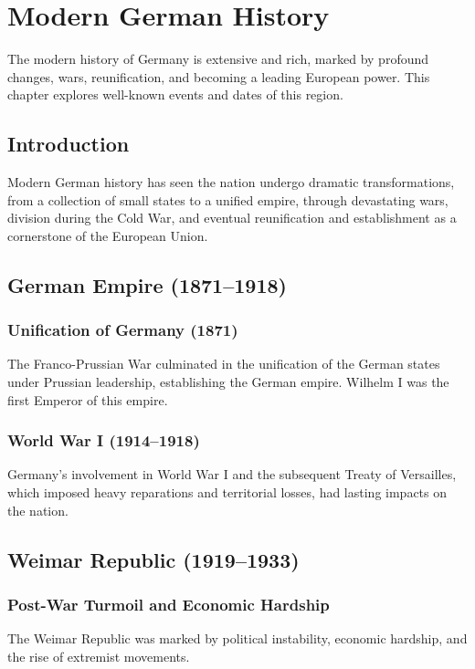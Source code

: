 \documentclass[a4paper,12pt]{book}
\begin{document}
\chapter{Modern German History}
\label{ch:modern-german-history}

The modern history of Germany is extensive and rich, marked by profound changes, wars, reunification, and becoming a leading European power. This chapter explores well-known events and dates of this region.

\section{Introduction}
\label{sec:introduction-modern-germany}
Modern German history has seen the nation undergo dramatic transformations, from a collection of small states to a unified empire, through devastating wars, division during the Cold War, and eventual reunification and establishment as a cornerstone of the European Union.

\section{German Empire (1871–1918)}
\label{sec:german-empire}
\subsection{Unification of Germany (1871)}
The Franco-Prussian War culminated in the unification of the German states under Prussian leadership, establishing the German empire. Wilhelm I was the first Emperor of this empire.

\subsection{World War I (1914–1918)}
Germany’s involvement in World War I and the subsequent Treaty of Versailles, which imposed heavy reparations and territorial losses, had lasting impacts on the nation.

\section{Weimar Republic (1919–1933)}
\label{sec:weimar-republic}
\subsection{Post-War Turmoil and Economic Hardship}
The Weimar Republic was marked by political instability, economic hardship, and the rise of extremist movements.
\end{document}
